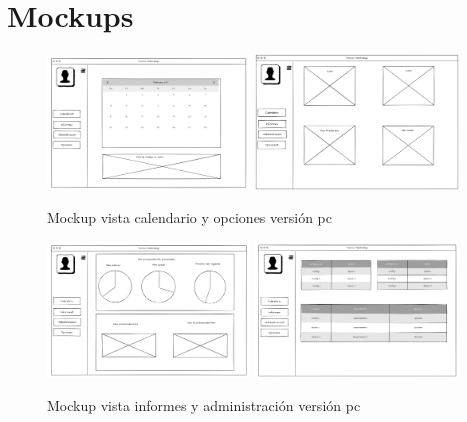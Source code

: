 \documentclass[11pt,spanish,listoffigures,listoftables]{tfgetsinf}
\begin{document}
\section{Mockups}

\begin{figure}[ht!] %
   \includegraphics[width=0.48\textwidth]{img/Vista_Calendario_PC.png}
   \includegraphics[width=0.48\textwidth]{img/Vista_Opciones_PC.png}
   \caption{Mockup vista calendario y opciones versión pc}
   \label{fig:calendarioPC}
 \end{figure}

 \begin{figure}[ht!] %
   \includegraphics[width=0.48\textwidth]{img/Vista_Informes_PC.png}
   \includegraphics[width=0.48\textwidth]{img/Vista_Administracion_PC.png}
   \caption{Mockup vista informes y administración versión pc}
   \label{fig:informesPC}
 \end{figure}
\end{document}
